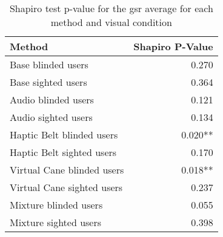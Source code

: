 
\begin{table}[!htb]
\centering
\caption{Shapiro test p-value for the gsr average for each method and visual condition}
\label{tab:shapiro_gsr_avg}
\begin{tabular}{lr}
\toprule
                    Method & Shapiro P-Value \\
\midrule
        Base blinded users &           0.270 \\
        Base sighted users &           0.364 \\
       Audio blinded users &           0.121 \\
       Audio sighted users &           0.134 \\
 Haptic Belt blinded users &         0.020** \\
 Haptic Belt sighted users &           0.170 \\
Virtual Cane blinded users &         0.018** \\
Virtual Cane sighted users &           0.237 \\
     Mixture blinded users &           0.055 \\
     Mixture sighted users &           0.398 \\
\bottomrule
\end{tabular}
\end{table}

